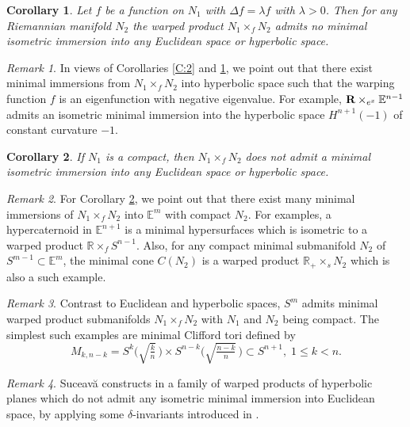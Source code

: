 \documentclass{amsart}
\theoremstyle{plain}
\newtheorem{corollary}{Corollary}[section]
\numberwithin{equation}{section}
\theoremstyle{remark}
\newtheorem{remark}{Remark}[section]
\numberwithin{equation}{section}
\begin{document}
\begin{corollary} \label{C:3} Let $f$ be a function on $N_1$ with $\Delta f=\lambda f$ with $\lambda>0$. Then for any Riemannian manifold $N_2$ the warped product $N_1\times_f N_2$ admits no  minimal isometric immersion into any Euclidean space or   hyperbolic space.
\end{corollary}

\begin{remark} {\rm In views of  Corollaries \ref{C:2} and \ref{C:3}, we point out that {there exist  minimal immersions from $N_1\times_f N_2$  into hyperbolic space such that the warping function $f$ is an eigenfunction with negative eigenvalue}. For example, $\hbox{\bf R}\times_{e^x} \mathbb E^{n-1}$ admits an isometric minimal immersion into the hyperbolic space $H^{n+1}(-1)$ of constant  curvature $-1$.}
\end{remark}  

\begin{corollary} \label{C:4}  If $N_1$ is a compact, then  $N_1\times_f N_2$ does not admit a minimal isometric immersion into any Euclidean space or hyperbolic space. \end{corollary} 

\begin{remark} {\rm For Corollary \ref{C:4}, we  point out that {there exist many  minimal immersions of $N_1\times_f N_2$ into $\mathbb E^m$ with compact $N_2$}. For examples, a hypercaternoid in $\mathbb E^{n+1}$ is a minimal hypersurfaces which is isometric to a warped product $\mathbb R\times_f
S^{n-1}$. Also, for any compact minimal submanifold $N_2$ of $S^{m-1}\subset\mathbb E^m$, the minimal cone $C(N_2)$ is a warped product $\mathbb
R_+\times_s N_2$ which is also a such example.} \end{remark} 

\begin{remark} {\rm Contrast to Euclidean and hyperbolic spaces,  $S^{m}$ {admits minimal warped product submanifolds $N_1\times_f N_2$ with  $N_1$ and $N_2$ being compact}. The simplest such examples are minimal Clifford tori defined by
$$M_{k,n-k}=S^k\Big(\sqrt{\tfrac{k}{n}}\,\Big)\times S^{n-k}\Big(\sqrt{\tfrac{n-k}{n}}\,\Big)\subset S^{n+1},\; 1\leq k<n.$$}
\end{remark} 

\begin{remark} {\rm  Suceav\u{a} constructs in \cite{suceava}  a family of warped products of hyperbolic planes which do not admit any isometric minimal immersion into Euclidean space, by applying some $\delta$-invariants introduced in \cite{c5}.}   \end{remark} 
   
\end{document}
